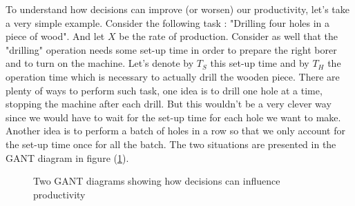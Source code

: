 To understand how decisions can improve (or worsen) our productivity, let's take a very simple example. Consider the following task : "Drilling four holes in a piece of wood". And let $X$ be the rate of production. Consider as well that the "drilling" operation needs some set-up time in order to prepare the right borer and to turn on the machine. Let's denote by $T_S$ this set-up time and by $T_H$ the operation time which is necessary to actually drill the wooden piece. There are plenty of ways to perform such task, one idea is to drill one hole at a time, stopping the machine after each drill. But this wouldn't be a very clever way since we would have to wait for the set-up time for each hole we want to make. Another idea is to perform a batch of holes in a row so that we only account for the set-up time once for all the batch. The two situations are presented in the GANT diagram in figure (\ref{intro:gant}).

\begin{figure}[h!]
    \centering
    \caption{\label{intro:gant}Two GANT diagrams showing how decisions can influence productivity}
\end{figure}

